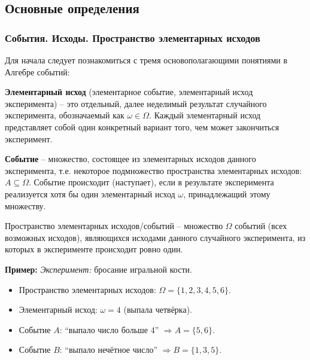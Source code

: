 \subsection{Основные определения}
\subsubsection{События. Исходы. Пространство элементарных исходов}

Для начала следует познакомиться с тремя основополагающими понятиями в Алгебре событий:

\begin{definition}
\textbf{Элементарный исход} (элементарное событие, элементарный исход эксперимента) -- это отдельный, далее неделимый результат случайного эксперимента, обозначаемый как $\omega \in \Omega$. Каждый элементарный исход представляет собой один конкретный вариант того, чем может закончиться эксперимент.
\end{definition}

\begin{definition}[Событие]
\textbf{Событие} -- множество, состоящее из элементарных исходов данного эксперимента, т.е. некоторое подмножество пространства элементарных исходов: $A \subseteq \Omega$. Событие происходит (наступает), если в результате эксперимента реализуется хотя бы один элементарный исход $\omega$, принадлежащий этому множеству.
\end{definition}

\begin{definition}
Пространство элементарных исходов/событий -- множество $\Omega$ событий (всех возможных исходов), являющихся исходами данного случайного эксперимента, из которых в эксперименте происходит ровно один.
\end{definition}

\textbf{Пример:}
    \textit{Эксперимент:} бросание игральной кости.
    \begin{itemize}
    \item Пространство элементарных исходов: $\Omega = \{1, 2, 3, 4, 5, 6\}$.
    
    \item Элементарный исход: $\omega = 4$ (выпала четвёрка).
    
    \item Событие $A$: ``выпало число больше 4'' $\Rightarrow A = \{5, 6\}$.
    
    \item Событие $B$: ``выпало нечётное число'' $\Rightarrow B = \{1, 3, 5\}$.
    \end{itemize}

